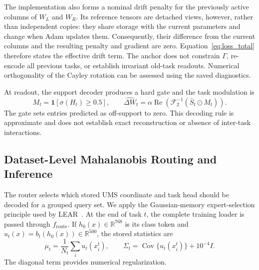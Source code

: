The implementation also forms a nominal drift penalty for the previously
active columns of $W_L$ and $W_R$.  Its reference tensors are detached views,
however, rather than independent copies: they share storage with the current
parameters and change when Adam updates them.  Consequently, their difference
from the current columns and the resulting penalty and gradient are zero.
Equation~\eqref{eq:loss_total} therefore states the effective drift term.  The
anchor does not constrain $\Gamma$, re-encode all previous tasks, or establish
invariant old-task readouts.  Numerical orthogonality of the Cayley rotation
can be assessed using the saved diagnostics.

At readout, the support decoder produces a hard gate and the task modulation is
\begin{equation}
 M_t=\mathbf{1}[\sigma(H_t)\geq0.5],\qquad
 \widehat{\Delta W}_t
 =\alpha\operatorname{Re}\!\left(
 \mathcal{F}^{-1}_2(\bar S_t\odot M_t)\right).
 \label{eq:ums_readout}
\end{equation}
The gate sets entries predicted as off-support to zero.  This decoding rule is
approximate and does not establish exact reconstruction or absence of
inter-task interactions.

\subsection{Dataset-Level Mahalanobis Routing and Inference}
\label{sec:routing}

The router selects which stored UMS coordinate and task head should be decoded
for a grouped query set.  We apply the Gaussian-memory expert-selection
principle used by LEAR~\cite{yu2025lear}.  At the end of task $t$, the complete
training loader is passed through $f_{\mathrm{route}}$.
If $h_0(x)\in\mathbb{R}^{768}$ is its
class token and $u_t(x)=b_t(h_0(x))\in\mathbb{R}^{500}$, the stored statistics
are
\begin{equation}
 \mu_t=\frac{1}{N_t}\sum_i u_t(x_i^t),\qquad
 \Sigma_t=\operatorname{Cov}\{u_t(x_i^t)\}+10^{-4}I.
 \label{eq:gaussian_memory}
\end{equation}
The diagonal term provides numerical regularization.

